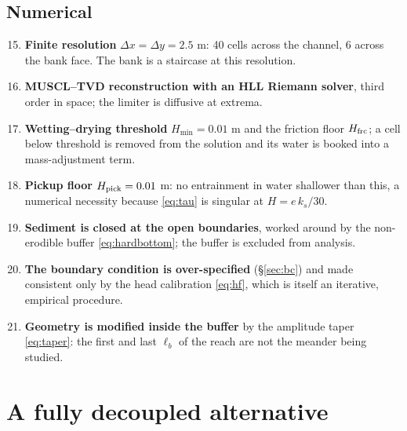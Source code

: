 \documentclass[11pt,a4paper]{article}
\begin{document}
\subsection{Numerical}
\begin{enumerate}\setcounter{enumi}{14}\itemsep1pt
  \item \textbf{Finite resolution} $\Delta x=\Delta y=2.5$ m: 40 cells across the channel,
        6 across the bank face. The bank is a staircase at this resolution.
  \item \textbf{MUSCL--TVD reconstruction with an HLL Riemann solver}, third order in
        space; the limiter is diffusive at extrema.
  \item \textbf{Wetting--drying threshold} $H_{\min}=0.01$ m and the friction floor
        $H_{\rm frc}$; a cell below threshold is removed from the solution and its water
        is booked into a mass-adjustment term.
  \item \textbf{Pickup floor} $H_{\rm pick}=0.01$ m: no entrainment in water shallower
        than this, a numerical necessity because \eqref{eq:tau} is singular at
        $H=e\,k_s/30$.
  \item \textbf{Sediment is closed at the open boundaries}, worked around by the
        non-erodible buffer \eqref{eq:hardbottom}; the buffer is excluded from analysis.
  \item \textbf{The boundary condition is over-specified} (\S\ref{sec:bc}) and made
        consistent only by the head calibration \eqref{eq:hf}, which is itself an
        iterative, empirical procedure.
  \item \textbf{Geometry is modified inside the buffer} by the amplitude taper
        \eqref{eq:taper}: the first and last $\ell_b$ of the reach are not the meander
        being studied.
\end{enumerate}

\section{A fully decoupled alternative}
\label{sec:decouple}
\end{document}
